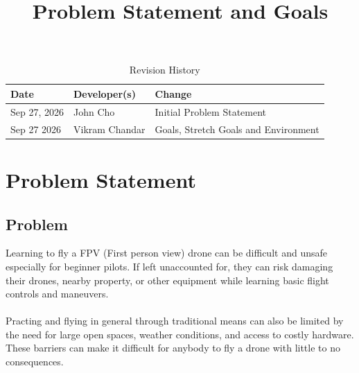 \documentclass{article}
\title{Problem Statement and Goals\\\progname}
\author{\authname}
\date{}
\begin{document}
\maketitle

\begin{table}[hp]
\caption{Revision History} \label{TblRevisionHistory}
\begin{tabularx}{\textwidth}{llX}
\toprule
\textbf{Date} & \textbf{Developer(s)} & \textbf{Change}\\
\midrule
Sep 27, 2026 & John Cho & Initial Problem Statement\\
Sep 27 2026 & Vikram Chandar & Goals, Stretch Goals and Environment\\
\bottomrule
\end{tabularx}
\end{table}

\newpage

\section{Problem Statement}



\subsection{Problem}

Learning to fly a FPV (First person view) drone can be difficult and unsafe especially 
for beginner pilots. If left unaccounted for, they can risk damaging their drones, nearby 
property, or other equipment while learning basic flight controls and maneuvers.
\\ \\
Practing and flying in general through traditional means can also be limited by the need 
for large open spaces, weather conditions, and access to costly hardware. 
These barriers can make it difficult for anybody to fly a drone with little to no
consequences.
\end{document}
